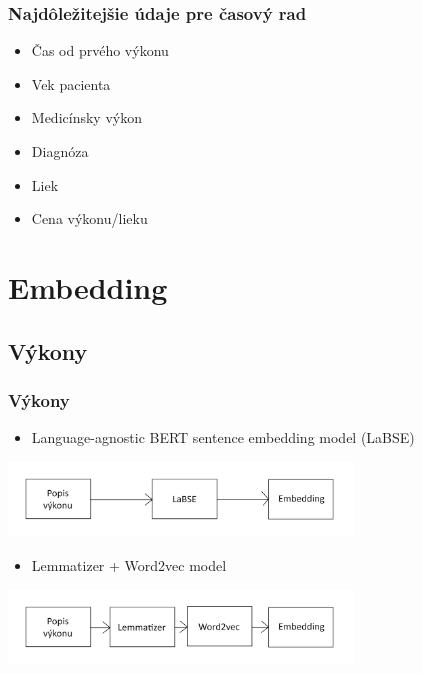 \documentclass[slovak]{beamer}
\begin{document}
\begin{frame}  
	\frametitle{Najdôležitejšie údaje pre časový rad}
	\begin{itemize}
		\item<1> Čas od prvého výkonu
		\item<1> Vek pacienta
		\item<1> Medicínsky výkon
		\item<1> Diagnóza
		\item<1> Liek 
		\item<1> Cena výkonu/lieku
	\end{itemize} 
\end{frame}

\section{Embedding}

\subsection{Výkony}

\begin{frame}
	\frametitle{Výkony}
	\begin{itemize}
		\item<1> Language-agnostic BERT sentence embedding model (LaBSE)
	\end{itemize}
		
	\begin{center}
		\includegraphics[height=2cm]{images/LaBSE.png}
	\end{center}
	
	\begin{itemize}
		\item<1> Lemmatizer + Word2vec model
	\end{itemize}
	
	\begin{center}
		\includegraphics[height=2cm]{images/LemW2v.png}
	\end{center}
\end{frame}
\end{document}
